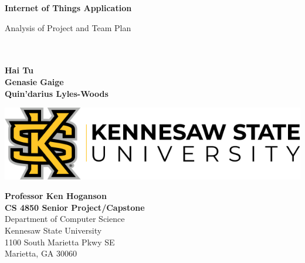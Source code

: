 \begin{titlepage}
\begin{center}
	\vspace*{1cm}

	\Huge
	\textbf{Internet of Things Application}

	\vspace{0.5cm}
	\LARGE
	Analysis of Project and Team Plan

	\vspace{1.5cm}
    \Large

	\textbf{}\\
	\textbf{}\\
	\textbf{Hai Tu}\\
	\textbf{Genasie Gaige}\\
	\textbf{Quin'darius Lyles-Woods}\\
    

	\vfill
	\LARGE
	\vspace{0.8cm}

	\includegraphics[width=\textwidth]{kennesawlogo}

	\vspace{0.8cm}

	\Large
	\textbf{Professor Ken Hoganson} 			\\
    \textbf{CS 4850 Senior Project/Capstone} \\
	Department of Computer Science   \\
	Kennesaw State University       \\
	1100 South Marietta Pkwy SE     \\
	Marietta, GA 30060              \\

	\vspace{1cm}

\end{center}
\end{titlepage}
